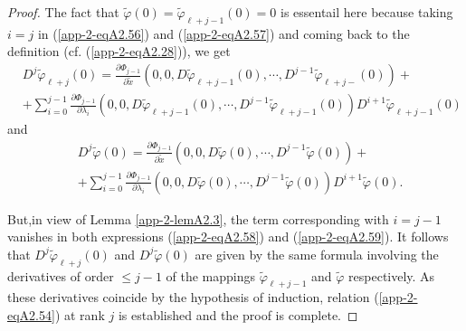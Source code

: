 \begin{proof}
The fact that $\widetilde{\varphi}(0) = \widetilde{\varphi}_{\ell + j
  - 1}(0) = 0$ is essentail here because taking $i = j$ in (\ref{app-2-eqA2.56}) and
(\ref{app-2-eqA2.57}) and coming back to the definition (cf. (\ref{app-2-eqA2.28})), we get
\begin{align*}
& D^{j}\widetilde{\varphi}_{\ell + j}(0) = \frac{\partial
    \Phi_{j-1}}{\partial \widetilde{x}} (0, 0,
  D\widetilde{\varphi}_{\ell + j - 1}(0), \cdots,
  D^{j-1}\widetilde{\varphi}_{\ell + j - }(0)) + \tag{A2.58}\label{app-2-eqA2.58}\\
& + \sum\limits_{i=0}^{j-1} \frac{\partial \Phi_{j-1}}{\partial
    \lambda_{i}} (0, 0, D \widetilde{\varphi}_{\ell + j - 1} (0),
  \cdots, D^{j-1} \widetilde{\varphi}_{\ell + j - 1} (0))
  D^{i+1}\widetilde{\varphi}_{\ell + j - 1}(0)
\end{align*}
and
\begin{align*}
& D^{j}\widetilde{\varphi}(0) = \frac{\partial \Phi_{j-1}}{\partial
    \widetilde{x}} (0, 0, D\widetilde{\varphi}(0), \cdots,
  D^{j-1}\widetilde{\varphi}(0)) + \tag{A2.59}\label{app-2-eqA2.59}\\
& + \sum\limits_{i = 0}^{j-1} \frac{\partial \Phi_{j-1}}{\partial
    \lambda_{i}} (0, 0, D\widetilde{\varphi}(0), \cdots,
  D^{j-1}\widetilde{\varphi}(0)) D^{i+1}\widetilde{\varphi}(0).
\end{align*}

But,\pageoriginale in view of Lemma \ref{app-2-lemA2.3}, the term corresponding with
$i = j - 1$ vanishes in both expressions (\ref{app-2-eqA2.58}) and (\ref{app-2-eqA2.59}). It
follows that $D^{j}\widetilde{\varphi}_{\ell + j}(0)$ and
$D^{j}\widetilde{\varphi}(0)$ are given by the same formula involving
the derivatives of order $\leq j - 1$ of the mappings
$\widetilde{\varphi}_{\ell + j - 1}$ and $\widetilde{\varphi}$
respectively. As these derivatives coincide by the hypothesis of
induction, relation (\ref{app-2-eqA2.54}) at rank $j$ is established and the proof is complete.
\end{proof}

